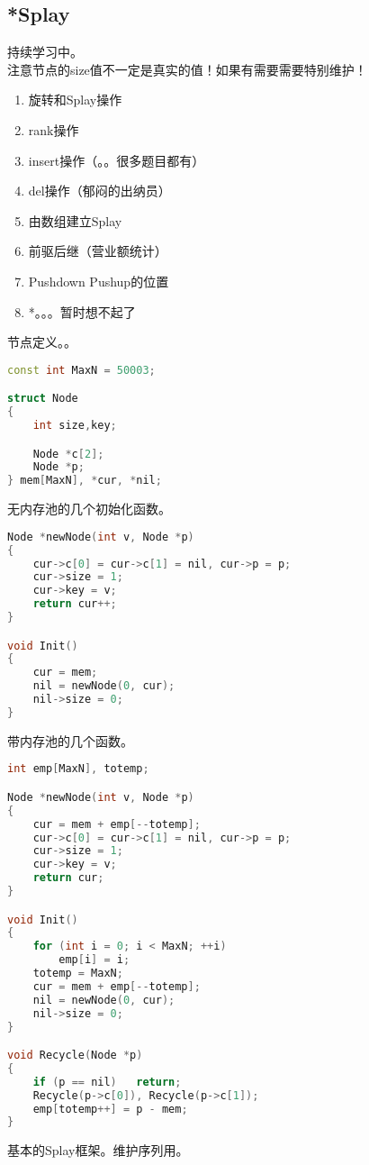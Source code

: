 \subsection{*Splay}
	持续学习中。\\
	注意节点的size值不一定是真实的值！如果有需要需要特别维护！\\
	\begin{enumerate}
	  \item 旋转和Splay操作
	  \item rank操作
	  \item insert操作（。。很多题目都有）
	  \item del操作（郁闷的出纳员）
	  \item 由数组建立Splay
	  \item 前驱后继（营业额统计）
	  \item Pushdown Pushup的位置
	  \item *。。。暂时想不起了
	\end{enumerate}
	节点定义。。\\
	\begin{lstlisting}[language=c++]
const int MaxN = 50003;

struct Node
{
	int size,key;

	Node *c[2];
	Node *p;
} mem[MaxN], *cur, *nil;
	\end{lstlisting}
	无内存池的几个初始化函数。\\
	\begin{lstlisting}[language=c++]
Node *newNode(int v, Node *p)
{
	cur->c[0] = cur->c[1] = nil, cur->p = p;
	cur->size = 1;
	cur->key = v;
	return cur++;
}

void Init()
{
	cur = mem;
	nil = newNode(0, cur);
	nil->size = 0;
}
	\end{lstlisting}
	带内存池的几个函数。\\
	\begin{lstlisting}[language=c++]
int emp[MaxN], totemp;

Node *newNode(int v, Node *p)
{
	cur = mem + emp[--totemp];
	cur->c[0] = cur->c[1] = nil, cur->p = p;
	cur->size = 1;
	cur->key = v;
	return cur;
}

void Init()
{
	for (int i = 0; i < MaxN; ++i)
		emp[i] = i;
	totemp = MaxN;
	cur = mem + emp[--totemp];
	nil = newNode(0, cur);
	nil->size = 0;
}

void Recycle(Node *p)
{
	if (p == nil)   return;
	Recycle(p->c[0]), Recycle(p->c[1]);
	emp[totemp++] = p - mem;
}
	\end{lstlisting}
	基本的Splay框架。维护序列用。\\
